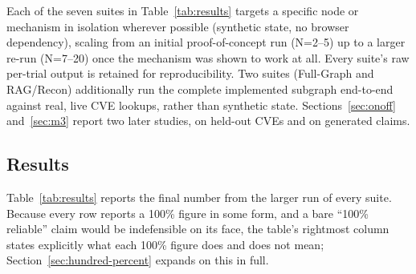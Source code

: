 \documentclass[conference]{IEEEtran}
\begin{document}
Each of the seven suites in Table~\ref{tab:results} targets a specific node or mechanism in
isolation wherever possible (synthetic state, no browser dependency),
scaling from an initial proof-of-concept run (N=2--5) up to a
larger re-run (N=7--20) once the mechanism was shown to
work at all. Every suite's raw per-trial output is retained for
reproducibility. Two suites (Full-Graph and RAG/Recon) additionally run
the complete implemented subgraph end-to-end against real, live CVE
lookups, rather than synthetic state. Sections~\ref{sec:onoff} and~\ref{sec:m3}
report two later studies, on held-out CVEs and on generated claims.

\subsection{Results}

Table~\ref{tab:results} reports the final number from the larger run of
every suite. Because every row reports a 100\% figure in some form, and a bare
``100\% reliable'' claim would be indefensible on its face, the table's
rightmost column states explicitly what each 100\% figure does and does not
mean; Section~\ref{sec:hundred-percent} expands on this in full.
\end{document}
